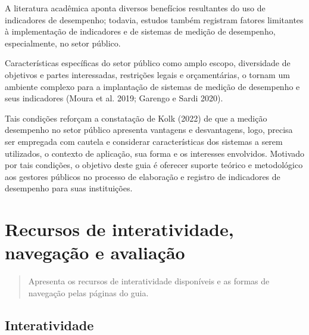 \documentclass[
  letterpaper,
  DIV=11,
  numbers=noendperiod]{scrreprt}
\begin{document}
A literatura acadêmica aponta diversos benefícios resultantes do uso de
indicadores de desempenho; todavia, estudos também registram fatores
limitantes à implementação de indicadores e de sistemas de medição de
desempenho, especialmente, no setor público.

\begin{tcolorbox}[enhanced jigsaw, colframe=quarto-callout-warning-color-frame, opacityback=0, toprule=.15mm, breakable, leftrule=.75mm, title=\textcolor{quarto-callout-warning-color}{\faExclamationTriangle}\hspace{0.5em}{Importante}, rightrule=.15mm, colbacktitle=quarto-callout-warning-color!10!white, colback=white, arc=.35mm, bottomtitle=1mm, toptitle=1mm, bottomrule=.15mm, titlerule=0mm, opacitybacktitle=0.6, coltitle=black, left=2mm]

Características específicas do setor público como amplo escopo,
diversidade de objetivos e partes interessadas, restrições legais e
orçamentárias, o tornam um ambiente complexo para a implantação de
sistemas de medição de desempenho e seus indicadores (Moura et al. 2019;
Garengo e Sardi 2020).

\end{tcolorbox}

Tais condições reforçam a constatação de Kolk (2022) de que a medição
desempenho no setor público apresenta vantagens e desvantagens, logo,
precisa ser empregada com cautela e considerar características dos
sistemas a serem utilizados, o contexto de aplicação, sua forma e os
interesses envolvidos. Motivado por tais condições, o objetivo deste
guia é oferecer suporte teórico e metodológico aos gestores públicos no
processo de elaboração e registro de indicadores de desempenho para suas
instituições.

\hypertarget{recursos-de-interatividade-navegauxe7uxe3o-e-avaliauxe7uxe3o}{%
\chapter{Recursos de interatividade, navegação e
avaliação}\label{recursos-de-interatividade-navegauxe7uxe3o-e-avaliauxe7uxe3o}}

\begin{quote}
Apresenta os recursos de interatividade disponíveis e as formas de
navegação pelas páginas do guia.
\end{quote}

\hypertarget{interatividade}{%
\section{Interatividade}\label{interatividade}}
\end{document}
